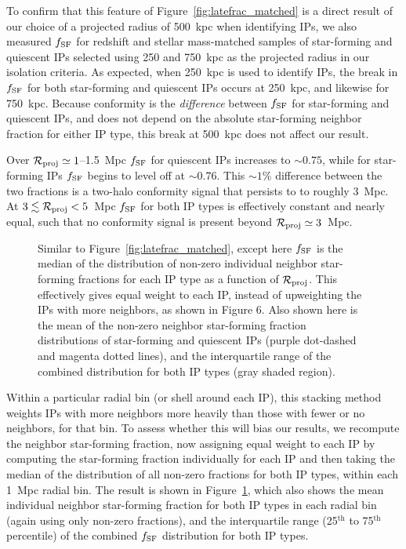 To confirm that this feature of Figure~\ref{fig:latefrac_matched} is a direct result of our choice of a
projected radius of 500~kpc when identifying IPs, we also measured $\flate$ for redshift and stellar 
mass-matched samples of star-forming and quiescent IPs selected using 250 and 750~kpc as the projected 
radius in our isolation criteria.
As expected, when 250~kpc is used to identify IPs, the break in $\flate$ 
for both star-forming and quiescent IPs occurs at 250~kpc, and likewise for 750~kpc.
Because conformity is the \emph{difference} between $\flate$ for star-forming and quiescent IPs, and does
not depend on the absolute star-forming neighbor fraction for either IP type, this break at 500~kpc does
not affect our result.

Over $\mathcal{R}_{\text{proj}}\simeq1$--1.5~Mpc $\flate$ for quiescent IPs increases to $\sim0.75$, while for star-forming IPs $\flate$ begins to level off at $\sim0.76$.  This $\sim1$\% difference between the two fractions is a two-halo conformity signal that persists to to roughly 3~Mpc.  At $3\lesssim\mathcal{R}_{\text{proj}}<5$~Mpc $\flate$ for both IP types is effectively constant and nearly equal, such that no conformity signal is present beyond $\mathcal{R}_{\text{proj}}\simeq3$~Mpc.


\begin{figure}
  \epstrim{0.5in 0.1in 0.3in 0.3in}
  \caption{
Similar to Figure~\ref{fig:latefrac_matched}, except here $\flate$ is the median of 
the distribution of non-zero individual neighbor star-forming fractions for each IP type as a function of $\mathcal{R}_{\text{proj}}$.  This effectively gives equal weight to each IP, instead of upweighting the IPs with more neighbors, as shown in Figure 6.
Also shown here is the mean of the non-zero neighbor star-forming fraction distributions of star-forming and quiescent IPs (purple dot-dashed and magenta dotted lines),
and the interquartile range of the combined distribution for both IP types (gray shaded region).
}
  \label{fig:latefrac_quartiles}
\end{figure}

Within a particular radial bin (or shell around each IP), this stacking method 
weights IPs with more neighbors more heavily than those with fewer or no neighbors,
for that bin.
To assess whether this will bias our results, we recompute the neighbor star-forming fraction, 
now assigning equal weight to each IP by computing the star-forming fraction 
individually for each IP and then taking the median of the distribution of all 
non-zero fractions for both IP types, within each 1~Mpc radial bin.
The result is shown in Figure~\ref{fig:latefrac_quartiles}, which also shows the 
mean individual neighbor star-forming fraction for both IP types in each radial bin (again using
only non-zero fractions), and the interquartile range (25$^{\textrm{th}}$ to 75$^{\textrm{th}}$ percentile) of the combined $\flate$ distribution for both IP types.

